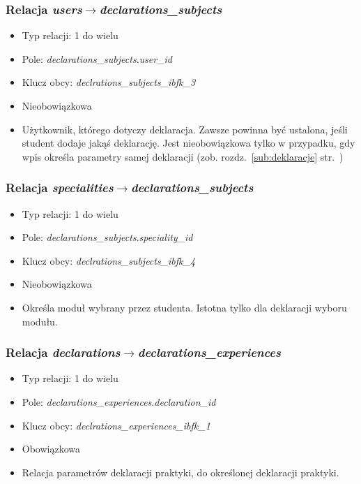 \documentclass[a4paper,12pt,oneside]{report}
\begin{document}
\subsubsection{Relacja \emph{users}$\to$\emph{declarations\_subjects}}
\label{subsub:users-declarations_subjects}
\begin{itemize}
  \item Typ relacji: 1 do wielu
  \item Pole: \emph{declarations\_subjects}.\emph{user\_id}
  \item Klucz obcy: \emph{declrations\_subjects\_ibfk\_3}
  \item Nieobowiązkowa
  \item Użytkownik, którego dotyczy deklaracja. Zawsze powinna być ustalona, jeśli student dodaje jakąś deklarację. Jest nieobowiązkowa tylko w przypadku, gdy wpis określa parametry samej deklaracji (zob. rozdz.~\ref{sub:deklaracje} str.~\pageref{sub:deklaracje})
\end{itemize}

\subsubsection{Relacja \emph{specialities}$\to$\emph{declarations\_subjects}}
\label{subsub:specialities-declarations_subjects}
\begin{itemize}
  \item Typ relacji: 1 do wielu
  \item Pole: \emph{declarations\_subjects}.\emph{speciality\_id}
  \item Klucz obcy: \emph{declrations\_subjects\_ibfk\_4}
  \item Nieobowiązkowa
  \item Określa moduł wybrany przez studenta. Istotna tylko dla deklaracji wyboru modułu.
\end{itemize}

\subsubsection{Relacja \emph{declarations}$\to$\emph{declarations\_experiences}}
\label{subsub:declarations-declarations_experiences}
\begin{itemize}
  \item Typ relacji: 1 do wielu
  \item Pole: \emph{declarations\_experiences}.\emph{declaration\_id}
  \item Klucz obcy: \emph{declrations\_experiences\_ibfk\_1}
  \item Obowiązkowa
  \item Relacja parametrów deklaracji praktyki, do określonej deklaracji praktyki.
\end{itemize}
\end{document}
